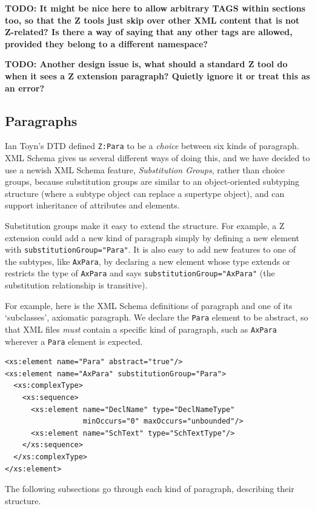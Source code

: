 \documentclass{llncs}  %
\newcommand{\TODO}[1]{\textbf{TODO: #1}}   %
\begin{document}
\TODO{It might be nice here to allow arbitrary TAGS within sections too, so
  that the Z tools just skip over other XML content that is not Z-related?
  Is there a way of saying that any other tags are allowed,
  provided they belong to a different namespace?}

\TODO{ Another design issue is, what should a standard Z tool do when it
  sees a Z extension paragraph?  Quietly ignore it or treat this as an
  error?  } 


\subsection{Paragraphs}

Ian Toyn's DTD defined \verb!Z:Para! to be a \emph{choice} between six
kinds of paragraph.  XML Schema gives us several different ways of doing
this, and we have decided to use a newish XML Schema feature,
\emph{Substitution Groups}, rather than choice groups, because substitution
groups are similar to an object-oriented subtyping structure (where a
subtype object can replace a supertype object), and can support inheritance
of attributes and elements.   

Substitution groups make it easy to extend the structure.  For example, a Z
extension could add a new kind of paragraph simply by defining a new
element with \texttt{substitutionGroup="Para"}.  It is also easy to add new
features to one of the subtypes, like \texttt{AxPara}, by declaring a new
element whose type extends or restricts the type of \texttt{AxPara} and
says \texttt{substitutionGroup="AxPara"} (the substitution relationship is
transitive).

For example, here is the XML Schema definitions of paragraph and one of its
`subclasses', axiomatic paragraph.  We declare the \texttt{Para} element to
be abstract, so that XML files \emph{must} contain a specific kind of
paragraph, such as \texttt{AxPara} wherever a \texttt{Para} element is
expected.
\begin{verbatim}
<xs:element name="Para" abstract="true"/>
<xs:element name="AxPara" substitutionGroup="Para">
  <xs:complexType>
    <xs:sequence>
      <xs:element name="DeclName" type="DeclNameType" 
                  minOccurs="0" maxOccurs="unbounded"/>
      <xs:element name="SchText" type="SchTextType"/>
    </xs:sequence>
  </xs:complexType>
</xs:element>
\end{verbatim}

The following subsections go
through each kind of paragraph, describing their structure.
\end{document}
